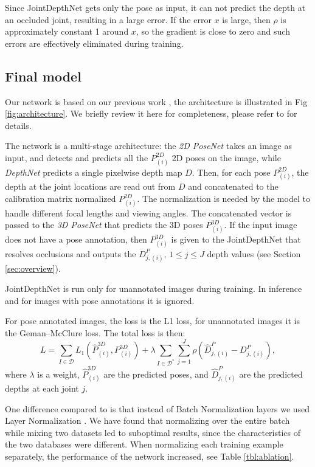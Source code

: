 \documentclass[runningheads]{llncs}
\begin{document}
Since JointDepthNet gets only the pose as input, it can not predict the depth at an occluded joint, resulting in a large error. If the error $x$ is large, then $\rho$ is approximately constant 1 around $x$, so the gradient is close to zero and such errors are effectively eliminated during training.

\subsection{Final model}\label{sec:full-model}

Our network is based on our previous work \cite{veges2019depthpose}, the architecture is illustrated in Fig \ref{fig:architecture}. We briefly review it here for completeness, please refer to \cite{veges2019depthpose} for details.

The network is a multi-stage architecture: the \emph{2D PoseNet} takes an image as input, and detects and predicts all the $P^{2D}_{(i)}$ 2D poses on the image, while \emph{DepthNet} predicts a single pixelwise depth map $D$. Then, for each pose $P^{2D}_{(i)}$, the depth at the joint locations are read out from $D$ and concatenated to the calibration matrix normalized $P^{2D}_{(i)}$. The normalization is needed by the model to handle different focal lengths and viewing angles. The concatenated vector is passed to the \emph{3D PoseNet} that predicts the 3D poses $P^{3D}_{(i)}$. If the input image does not have a pose annotation, then $P^{3D}_{(i)}$ is given to the JointDepthNet that resolves occlusions and outputs the $D^P_{j,(i)},\, 1\le j\le J$ depth values (see Section \ref{sec:overview}). 

JointDepthNet is run only for unannotated images during training. In inference and for images with pose annotations it is ignored.

For pose annotated images, the loss is the L1 loss, for unannotated images it is the Geman--McClure loss. The total loss is then:
$$L=\sum_{I\in \mathcal{D}}L_1\left(\hat{P}^{3D}_{(i)},P^{3D}_{(i)}\right)+\lambda\sum_{I\in \mathcal{D}^*}\sum_{j=1}^J\rho\left(\hat{D}^P_{j,(i)}-D^P_{j,(i)}\right),$$
where $\lambda$ is a weight, $\hat{P}^{3D}_{(i)}$ are the predicted poses, and $\hat{D}^P_{j,(i)}$ are the predicted depths at each joint $j$.

One difference compared to \cite{veges2019depthpose} is that instead of Batch Normalization layers \cite{batchnorm} we used Layer Normalization \cite{ba2016layer}. We have found that normalizing over the entire batch while mixing two datasets led to suboptimal results, since the characteristics of the two databases were different. When normalizing each training example separately, the performance of the network increased, see Table \ref{tbl:ablation}.
\end{document}

